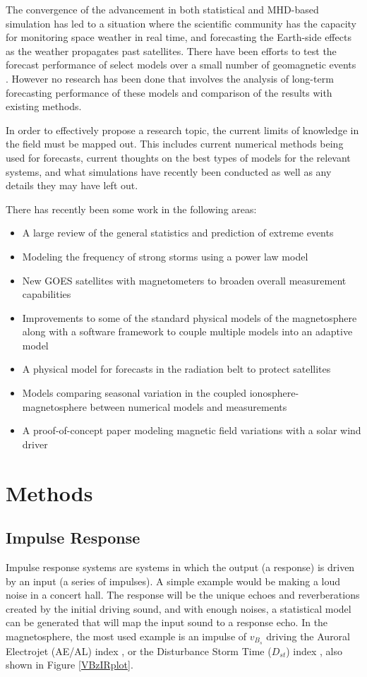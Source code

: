 \documentclass[10pt]{article}
\begin{document}
The convergence of the advancement in both statistical and MHD-based simulation has led to a situation where the scientific community has the capacity for monitoring space weather in real time, and forecasting the Earth-side effects as the weather propagates past satellites.  There have been efforts to test the forecast performance of select models over a small number of geomagnetic events \citep{ANNforecast,StormModel,StatCompStorms,Yermolaev}. However no research has been done that involves the analysis of long-term forecasting performance of these models and comparison of the results with existing methods.

In order to effectively propose a research topic, the current limits of knowledge in the field must be mapped out. This includes current numerical methods being used for forecasts, current thoughts on the best types of models for the relevant systems, and what simulations have recently been conducted as well as any details they may have left out.

There has recently been some work in the following areas:
\begin{itemize} 
\item A large review of the general statistics and prediction of extreme events \citep{ExtremeEvents}
\item Modeling the frequency of strong storms using a power law model \citep{PowerLaw}
\item New GOES satellites with magnetometers to broaden overall measurement capabilities \citep{NewGOES}
\item Improvements to some of the standard physical models of the magnetosphere along with a software framework to couple multiple models into an adaptive model \citep{SWMF}
\item A physical model for forecasts in the radiation belt to protect satellites \citep{RadBeltForecast}
\item Models comparing seasonal variation in the coupled ionosphere-magnetosphere between numerical models and measurements \citep{Seasons}
\item A proof-of-concept paper modeling magnetic field variations with a solar wind driver \citep{DOYvar}
\end{itemize}


\section{Methods}
\subsection{Impulse Response}
Impulse response systems are systems in which the output (a response) is driven by an input (a series of impulses). A simple example would be making a loud noise in a concert hall. The response will be the unique echoes and reverberations created by the initial driving sound, and with enough noises, a statistical model can be generated that will map the input sound to a response echo. In the magnetosphere, the most used example is an impulse of $v_{B_s}$ driving the Auroral Electrojet (AE/AL) index \citep{VBzAL}, or the Disturbance Storm Time ($D_{st}$) index \citep{VBzDST}, also shown in Figure \ref{VBzIRplot}.
\end{document}
